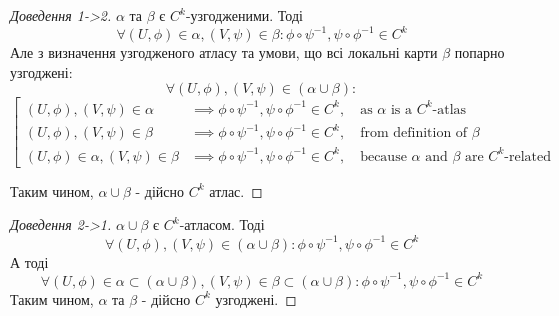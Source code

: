 \documentclass[10pt, a4paper]{article} %
\begin{document}
\begin{proof}[Доведення 1->2]
    $\alpha$ та $\beta$ є $C^k$-узгодженими.
    Тоді 
    \[\forall (U,\phi) \in \alpha, (V,\psi) \in \beta: \phi \circ \psi^{-1}, \psi \circ \phi^{-1} \in C^k\]
    Але з визначення узгодженого атласу та умови, що всі локальні карти $\beta$ попарно узгоджені: 
    \[\forall (U,\phi),(V,\psi) \in (\alpha\cup\beta): \]
    \[\left[\begin{array}{ll}
        (U,\phi),(V,\psi) \in \alpha &\implies \phi\circ\psi^{-1}, \psi \circ \phi^{-1} \in C^k,\quad \text{as $\alpha$ is a $C^k$-atlas} \\
        (U,\phi),(V,\psi) \in \beta &\implies \phi\circ\psi^{-1}, \psi \circ \phi^{-1} \in C^k,\quad \text{from definition of } \beta \\
        (U,\phi) \in \alpha, (V,\psi) \in \beta & \implies \phi\circ\psi^{-1}, \psi \circ \phi^{-1} \in C^k, \quad \text{because $\alpha$ and $\beta$ are $C^k$-related} 
    \end{array}\right.\]

    Таким чином, $\alpha\cup\beta$ - дійсно $C^k$ атлас.
\end{proof}

\begin{proof}[Доведення 2->1]
    $\alpha\cup\beta$ є $C^k$-атласом.
    Тоді 
    \[\forall (U,\phi),(V,\psi) \in (\alpha\cup\beta): \phi \circ \psi^{-1}, \psi \circ \phi^{-1} \in C^k\]
    А тоді 
    \[\forall (U,\phi) \in \alpha\subset (\alpha\cup\beta), (V,\psi) \in \beta \subset (\alpha\cup\beta): \phi \circ \psi^{-1}, \psi \circ \phi^{-1} \in C^k\]
    Таким чином, $\alpha$ та $\beta$ - дійсно $C^k$ узгоджені.
\end{proof}
\end{document}
